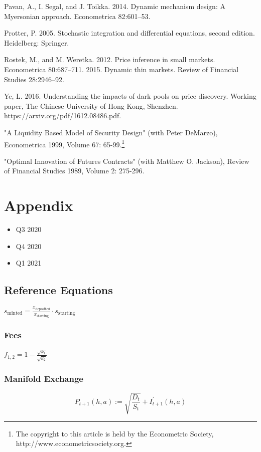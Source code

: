 {{{			
			Pavan, A., I. Segal, and J. Toikka. 2014. Dynamic mechanism design: A Myersonian approach.
			Econometrica 82:601–53.
			
			Protter, P. 2005. Stochastic integration and diﬀerential equations, second edition. Heidelberg:
			Springer.
			
			Rostek, M., and M. Weretka. 2012. Price inference in small markets. Econometrica 80:687–711.
			2015. Dynamic thin markets. Review of Financial Studies 28:2946–92.
			
			
			Ye, L. 2016. Understanding the impacts of dark pools on price discovery. Working paper, The
			Chinese University of Hong Kong, Shenzhen. https://arxiv.org/pdf/1612.08486.pdf.
			
			"A Liquidity Based Model of Security Design" (with Peter DeMarzo), Econometrica 1999, Volume 67: 65-99.\footnote{The copyright to this article is held by the Econometric Society, http://www.econometricsociety.org.}
			
			"Optimal Innovation of Futures Contracts" (with Matthew O. Jackson), Review of Financial Studies 
			1989, Volume 2: 275-296.
			
			\newpage
			
			\chapter{Appendix}
			
			\begin{itemize}
				\item Q3 2020
				\item Q4 2020
				\item Q1 2021
			\end{itemize}
			
			
			
			\section{Reference Equations}
			
			
			$
			s_{\text {minted}}=\frac{x_{\text {deposited}}}{x_{\text {starting}}} \cdot s_{\text {starting}}
			$
			
			\subsection{Fees}
			$
			f_{1,2}=1-\frac{\sqrt{k_{1}}}{\sqrt{k_{2}}}
			$
			
			
			
			\subsection{Manifold Exchange}
			\begin{equation}
				P_{t+1}(h, a):=\sqrt{\frac{D_{t}}{S_{t}}}+I_{t+1}^{\prime}(h, a)
			\end{equation}
			
}}}
